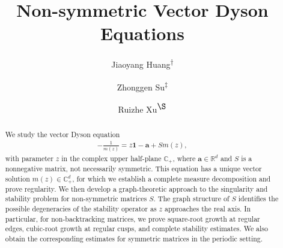 \documentclass[11pt,twoside, a4paper]{article}
\numberwithin{equation}{section}
\numberwithin{figure}{section}
\theoremstyle{plain} %
\theoremstyle{definition}
\theoremstyle{remark}
\newcommand{\1} {\mspace{1 mu}}
\newcommand{\2} {\mspace{2 mu}}
\newcommand{\Cp} {\mathbb {C}_+}
\begin{document}
\renewcommand{\thefootnote}{\fnsymbol{footnote}}

\title{Non-symmetric Vector Dyson Equations}

\author{
Jiaoyang Huang\textsuperscript{\(\dagger\)}
\and
Zhonggen Su\textsuperscript{\(\ddagger\)}
\and
Ruizhe Xu\textsuperscript{\(\S\)}
}


\date{}

\maketitle
\thispagestyle{empty}

\begingroup
\renewcommand{\thefootnote}{\fnsymbol{footnote}}





\endgroup

\vspace{-0.5cm}


\thispagestyle{empty} %


\maketitle
\thispagestyle{empty} %


\maketitle
\thispagestyle{empty} %
\vspace{-0.5cm}

\begin{abstract}
    We study the vector Dyson equation
    \begin{align*}
        -\frac1{m(z)}=z\mathbf1-\mathbf a+Sm(z),
    \end{align*}
    with parameter $z$ in the complex upper half-plane $\Cp$, where
    \(\mathbf a\in\mathbb R^d\) and \(S\) is a nonnegative matrix, not necessarily
    symmetric. This equation has a unique vector solution \(m(z)\in\Cp^d\), for which we establish a complete measure decomposition and prove regularity.
    We then develop a graph-theoretic approach to the singularity and stability problem for non-symmetric matrices \(S\). The graph structure of \(S\) identifies the
    possible degeneracies of the stability operator as $z$ approaches the real axis. In particular, for non-backtracking matrices, we prove
    square-root growth at regular edges, cubic-root growth at regular cusps, and
    complete stability estimates. We also obtain the corresponding estimates for
    symmetric matrices in the periodic setting.
\end{abstract}
\end{document}
